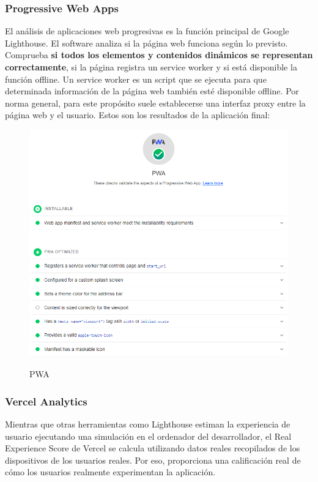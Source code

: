 \documentclass[12pt,twoside,titlepage]{report}
\begin{document}
\subsubsection{Progressive Web Apps}

El análisis de aplicaciones web progresivas es la función principal de Google Lighthouse. El software analiza si la página web funciona según lo previsto. Comprueba \textbf{si todos los elementos y contenidos dinámicos se representan correctamente}, si la página registra un service worker y si está disponible la función offline. Un service worker es un script que se ejecuta para que determinada información de la página web también esté disponible offline. Por norma general, para este propósito suele establecerse una interfaz proxy entre la página web y el usuario. Estos son los resultados de la aplicación final:

\begin{figure}[H]
    \centering
    \includegraphics[scale=0.6]{Lighthouse/PWA}
    \label{fig:Lighthouse_PWA}
    \caption{PWA}
\end{figure}

\subsubsection{Vercel Analytics}

Mientras que otras herramientas como Lighthouse estiman la experiencia de usuario ejecutando una simulación en el ordenador del desarrollador, el Real Experience Score de Vercel se calcula utilizando datos reales recopilados de los dispositivos de los usuarios reales. Por eso, proporciona una calificación real de cómo los usuarios realmente experimentan la aplicación.
\end{document}
